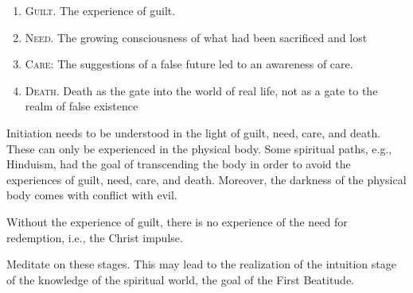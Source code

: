 \begin{enumerate}
\item \textsc{Guilt}. The experience of guilt. 
\item \textsc{Need}. The growing consciousness of what had been sacrificed and lost 
\item \textsc{Care}: The suggestions of a false future led to an awareness of care. 
\item \textsc{Death}. Death as the gate into the world of real life, not as a gate to the realm of false existence 
\end{enumerate}
Initiation needs to be understood in the light of guilt, need, care, and death. These can only be experienced in the
physical body. Some spiritual paths, e.g., Hinduism, had the goal of transcending the body in order to avoid the
experiences of guilt, need, care, and death. Moreover, the darkness of the physical body comes with conflict with evil.

Without the experience of guilt, there is no experience of the need for redemption, i.e., the Christ impulse.

Meditate on these stages. This may lead to the realization of the intuition stage of the knowledge of the spiritual
world, the goal of the First Beatitude.

